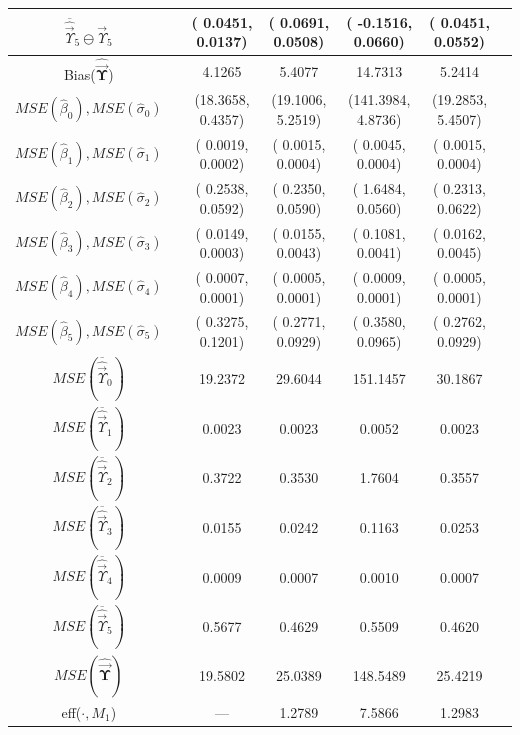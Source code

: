 \documentclass{IJFS}
\begin{document}
\begin{table}[!t]
{\begin{tabular}{|c|cccccc|}
$\overline{\widehat{\vec{\Upsilon}}}_5\ominus\vec{\Upsilon}_5$&&( 0.0451, 0.0137)&( 0.0691,  0.0508)&( -0.1516, 0.0660)&( 0.0451,  0.0552)&\\
\hline
Bias($\widehat{\vec{\boldsymbol{\Upsilon}}}$)              && 4.1265          &  5.4077          & 14.7313          & 5.2414   & \\
\hline
$MSE(\widehat{\beta}_0),MSE(\widehat{\sigma}_0)$&&(18.3658, 0.4357)&(19.1006, 5.2519) & (141.3984, 4.8736)&(19.2853,  5.4507)&\\
$MSE(\widehat{\beta}_1),MSE(\widehat{\sigma}_1)$&&( 0.0019, 0.0002)&( 0.0015, 0.0004) & (  0.0045, 0.0004)&( 0.0015,  0.0004)&\\
$MSE(\widehat{\beta}_2),MSE(\widehat{\sigma}_2)$&&( 0.2538, 0.0592)&( 0.2350, 0.0590) & (  1.6484, 0.0560)&( 0.2313,  0.0622)&\\
$MSE(\widehat{\beta}_3),MSE(\widehat{\sigma}_3)$&&( 0.0149, 0.0003)&( 0.0155, 0.0043) & (  0.1081, 0.0041)&( 0.0162,  0.0045)&\\
$MSE(\widehat{\beta}_4),MSE(\widehat{\sigma}_4)$&&( 0.0007, 0.0001)&( 0.0005, 0.0001) & (  0.0009, 0.0001)&( 0.0005,  0.0001)&\\
$MSE(\widehat{\beta}_5),MSE(\widehat{\sigma}_5)$&&( 0.3275, 0.1201)&( 0.2771, 0.0929) & (  0.3580, 0.0965)&( 0.2762,  0.0929)&\\
\hline
$MSE(\overline{\widehat{\vec{\Upsilon}}}_0)$&&    19.2372      &      29.6044    &  151.1457         &  30.1867  &\\
$MSE(\overline{\widehat{\vec{\Upsilon}}}_1)$&&     0.0023      &       0.0023    &    0.0052         &   0.0023  &\\
$MSE(\overline{\widehat{\vec{\Upsilon}}}_2)$&&     0.3722      &       0.3530    &    1.7604         &   0.3557  &\\
$MSE(\overline{\widehat{\vec{\Upsilon}}}_3)$&&     0.0155      &       0.0242    &    0.1163         &   0.0253  &\\
$MSE(\overline{\widehat{\vec{\Upsilon}}}_4)$&&     0.0009      &       0.0007    &    0.0010         &   0.0007  &\\
$MSE(\overline{\widehat{\vec{\Upsilon}}}_5)$&&     0.5677      &       0.4629    &    0.5509         &   0.4620  &\\
\hline
$MSE(\widehat{\vec{\boldsymbol{\Upsilon}}})$&&   19.5802       &    25.0389      &   148.5489        &   25.4219 & \\
\hline
eff($\cdot,M_1$)                        &&      ---         &    1.2789       & 7.5866            & 1.2983    &\\
\hline
\end{tabular}}
\end{table}
\end{document}

